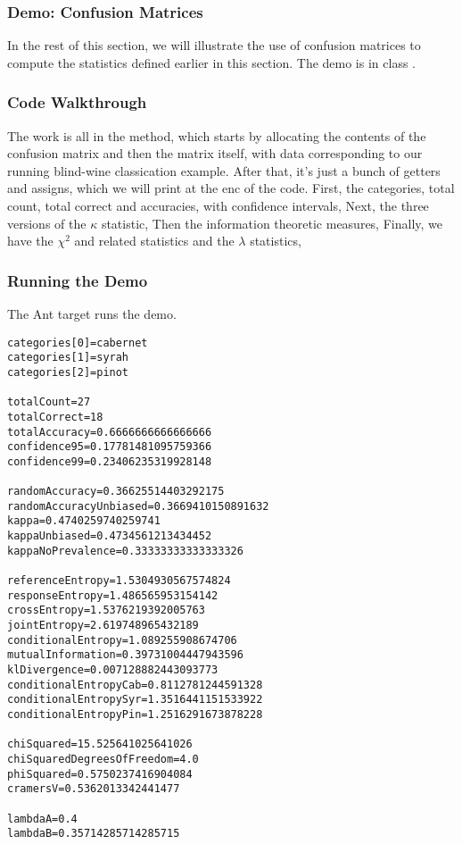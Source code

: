 \subsubsection{Demo: Confusion Matrices}

In the rest of this section, we will illustrate the use of confusion
matrices to compute the statistics defined earlier in this section.
The demo is in class .

\subsubsection{Code Walkthrough}

The work is all in the  method, which starts by
allocating the contents of the confusion matrix and then the matrix
itself, with data corresponding to our running blind-wine classication
example.
%
%
After that, it's just a bunch of getters and assigns, which we will
print at the enc of the code.  First, the categories, total count,
total correct and accuracies, with confidence intervals,
%
%
Next, the three versions of the $\kappa$ statistic,
%
%
Then the information theoretic measures,
%
%
Finally, we have the $\chi^2$ and related statistics and the $\lambda$ statistics,
%


\subsubsection{Running the Demo}

The Ant target  runs the demo.
%
\begin{verbatim}
categories[0]=cabernet
categories[1]=syrah
categories[2]=pinot

totalCount=27
totalCorrect=18
totalAccuracy=0.6666666666666666
confidence95=0.17781481095759366
confidence99=0.23406235319928148

randomAccuracy=0.36625514403292175
randomAccuracyUnbiased=0.3669410150891632
kappa=0.4740259740259741
kappaUnbiased=0.4734561213434452
kappaNoPrevalence=0.33333333333333326

referenceEntropy=1.5304930567574824
responseEntropy=1.486565953154142
crossEntropy=1.5376219392005763
jointEntropy=2.619748965432189
conditionalEntropy=1.089255908674706
mutualInformation=0.39731004447943596
klDivergence=0.007128882443093773
conditionalEntropyCab=0.8112781244591328
conditionalEntropySyr=1.3516441151533922
conditionalEntropyPin=1.2516291673878228

chiSquared=15.525641025641026
chiSquaredDegreesOfFreedom=4.0
phiSquared=0.5750237416904084
cramersV=0.5362013342441477

lambdaA=0.4
lambdaB=0.35714285714285715
\end{verbatim}



